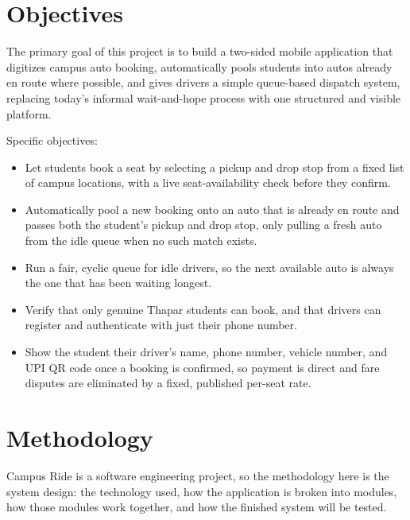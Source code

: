 \documentclass[11pt]{article}
\begin{document}
\section{Objectives}
The primary goal of this project is to build a two-sided mobile application that digitizes campus auto booking, automatically pools students into autos already en route where possible, and gives drivers a simple queue-based dispatch system, replacing today's informal wait-and-hope process with one structured and visible platform.

Specific objectives:
\begin{itemize}[leftmargin=1.4em, itemsep=0.2em]
  \item Let students book a seat by selecting a pickup and drop stop from a fixed list of campus locations, with a live seat-availability check before they confirm.
  \item Automatically pool a new booking onto an auto that is already en route and passes both the student's pickup and drop stop, only pulling a fresh auto from the idle queue when no such match exists.
  \item Run a fair, cyclic queue for idle drivers, so the next available auto is always the one that has been waiting longest.
  \item Verify that only genuine Thapar students can book, and that drivers can register and authenticate with just their phone number.
  \item Show the student their driver's name, phone number, vehicle number, and UPI QR code once a booking is confirmed, so payment is direct and fare disputes are eliminated by a fixed, published per-seat rate.
\end{itemize}

\section{Methodology}
Campus Ride is a software engineering project, so the methodology here is the system design: the technology used, how the application is broken into modules, how those modules work together, and how the finished system will be tested.
\end{document}
